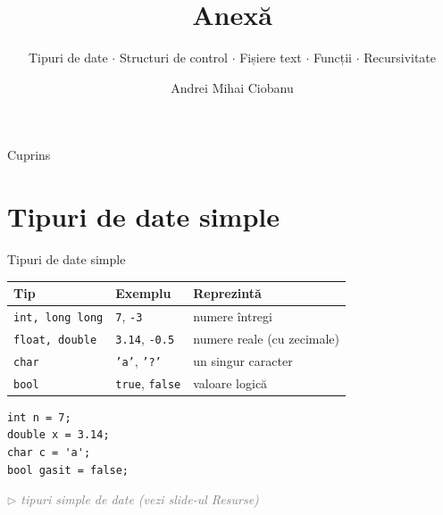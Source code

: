 \documentclass{beamer}
\title{Anexă}
\subtitle{Tipuri de date $\cdot$ Structuri de control $\cdot$ Fișiere text $\cdot$ Funcții $\cdot$ Recursivitate}
\author{Andrei Mihai Ciobanu}
\institute{Algolymp Summer School}
\date{}
\newcommand{\beginnote}[1]{%
  \vfill
  {\footnotesize\textcolor{gray}{\textit{$\triangleright$ #1 (vezi slide-ul \emph{Resurse})}}}%
}
\begin{document}
\begin{frame}[shrink]
  \titlepage
\end{frame}

\begin{frame}{Cuprins}
  \tableofcontents
\end{frame}

\section{Tipuri de date simple}

\begin{frame}[fragile]{Tipuri de date simple}
  \begin{center}
  \begin{tabular}{llp{4.5cm}}
    \toprule
    Tip & Exemplu & Reprezintă \\
    \midrule
    \texttt{int, long long}    & \texttt{7}, \texttt{-3}       & numere întregi \\
    \texttt{float,   double} & \texttt{3.14}, \texttt{-0.5}  & numere reale (cu zecimale) \\
    \texttt{char}   & \texttt{'a'}, \texttt{'?'}    & un singur caracter \\
    \texttt{bool}   & \texttt{true}, \texttt{false} & valoare logică \\
    \bottomrule
  \end{tabular}
  \end{center}

  \smallskip
  \begin{lstlisting}
int n = 7;
double x = 3.14;
char c = 'a';
bool gasit = false;
  \end{lstlisting}
  \beginnote{tipuri simple de date}
\end{frame}
\end{document}
